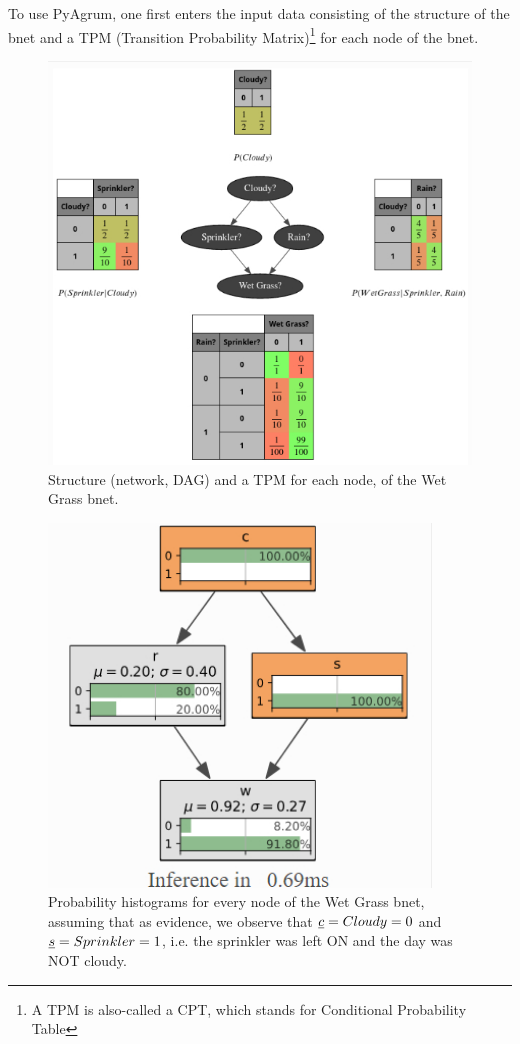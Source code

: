 To use PyAgrum, one first enters the input data consisting of the structure of the bnet and a TPM (Transition Probability Matrix)\footnote{A TPM is also-called
a CPT, which stands for Conditional Probability Table}
for each node of the bnet.


\begin{figure}[h!]
\centering
\includegraphics[width=6in]
{bnet-apps/wet-grass-bnet}
\caption{Structure (network, DAG) and a TPM for each node, of the Wet
Grass
bnet.}
\label{fig-wet-grass-bnet}
\end{figure}


\begin{figure}[h!]
\centering
\includegraphics[width=4in]
{bnet-apps/wet-grass-evidence}
\caption{Probability histograms for every node of the Wet Grass bnet,
assuming that as evidence, we observe that $\rvc=Cloudy=0$ and $\rvs=Sprinkler=1$, i.e. the sprinkler was left ON and the day was NOT cloudy.}
\label{fig-wet-grass-evidence}
\end{figure}

